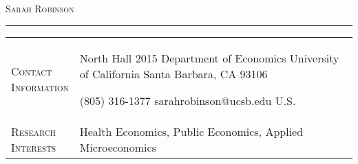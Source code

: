 \documentclass[11pt]{article}
\begin{document}
\begin{center}

{\Huge\textsc{Sarah Robinson}} \\[5pt]



\end{center}

\vspace{-6pt}

\noindent\rule{\textwidth}{1pt}

\vspace{6pt}

\begin{tabularx}{\textwidth}{@{}Y Z@{}}
	
	
	\textsc{Contact \newline Information} & 
	\begin{minipage}[t]{0.35\textwidth}
		North Hall 2015 \newline
		Department of Economics \newline
		University of California \newline
		Santa Barbara, CA 93106
	\end{minipage}\begin{minipage}[t]{0.4\textwidth}
	 (805) 316-1377 \newline
	 sarahrobinson@ucsb.edu \newline
	 \href{https://www.s-robinson.com}{\color{blue}{www.s-robinson.com}} \newline
	 U.S.
\end{minipage}
	\newline \\[15pt]
	
	\textsc{Research \newline Interests} \vspace{20pt} & 
	Health Economics, Public Economics, Applied Microeconomics
	\\[15pt]
	

\end{tabularx}
\end{document}

